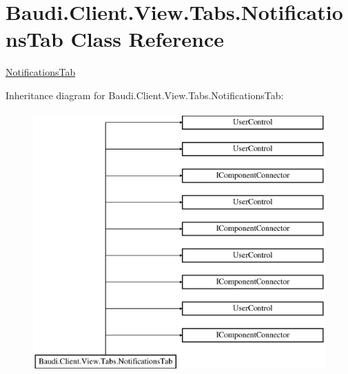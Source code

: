 \hypertarget{class_baudi_1_1_client_1_1_view_1_1_tabs_1_1_notifications_tab}{}\section{Baudi.\+Client.\+View.\+Tabs.\+Notifications\+Tab Class Reference}
\label{class_baudi_1_1_client_1_1_view_1_1_tabs_1_1_notifications_tab}


\hyperlink{class_baudi_1_1_client_1_1_view_1_1_tabs_1_1_notifications_tab}{Notifications\+Tab}  


Inheritance diagram for Baudi.\+Client.\+View.\+Tabs.\+Notifications\+Tab\+:\begin{figure}[H]
\begin{center}
\leavevmode
\includegraphics[height=10.000000cm]{class_baudi_1_1_client_1_1_view_1_1_tabs_1_1_notifications_tab}
\end{center}
\end{figure}
